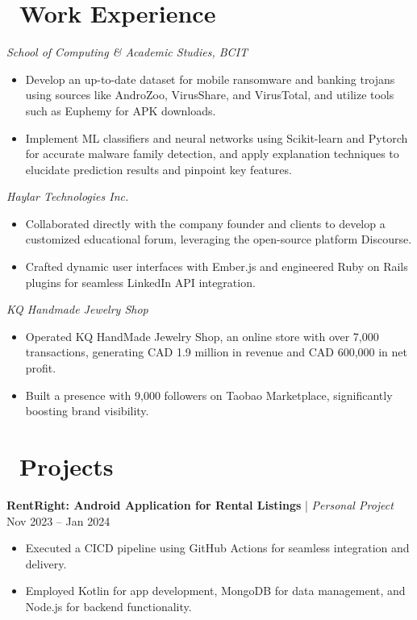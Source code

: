 \documentclass{resume}
\begin{document}
\section{\faUsers\ Work Experience}
\textit{School of Computing \& Academic Studies, BCIT }
\begin{itemize}
  \item Develop an up-to-date dataset for mobile ransomware and banking trojans using sources like AndroZoo, VirusShare, and VirusTotal, and utilize tools such as Euphemy for APK downloads.
  \item Implement ML classifiers and neural networks using Scikit-learn and Pytorch for accurate malware family detection, and apply explanation techniques to elucidate prediction results and pinpoint key features.
\end{itemize}
\textit{Haylar Technologies Inc.}
\begin{itemize}
  \item Collaborated directly with the company founder and clients to develop a customized educational forum, leveraging the open-source platform Discourse.
  \item Crafted dynamic user interfaces with Ember.js and engineered Ruby on Rails plugins for seamless LinkedIn API integration.
\end{itemize}

\textit{KQ Handmade Jewelry Shop}
\begin{itemize}
 \item Operated KQ HandMade Jewelry Shop, an online store with over 7,000 transactions, generating CAD 1.9 million in revenue and CAD 600,000 in net profit.
\item Built a presence with 9,000 followers on Taobao Marketplace, significantly boosting brand visibility.

\end{itemize}



\section{\faCogs\ Projects}
\vspace{1pt}
\noindent \textbf{RentRight: Android Application for Rental Listings} | \textit{Personal Project} \hfill Nov 2023 – Jan 2024
\begin{itemize}
  \item Executed a CICD pipeline using GitHub Actions for seamless integration and delivery.
  \item Employed Kotlin for app development, MongoDB for data management, and Node.js for backend functionality.
\end{itemize}
\end{document}
